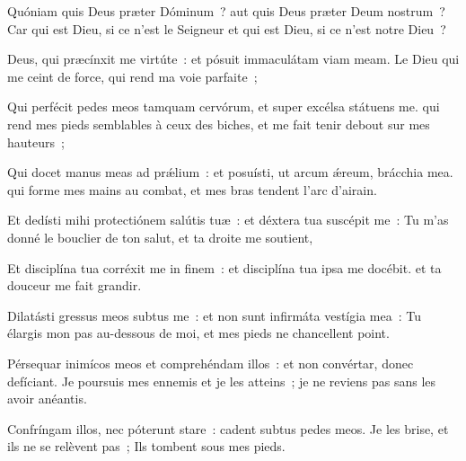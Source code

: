 
\begin{paracol}{2}

\LigneParacol{0cm}
{Quóniam quis Deus præter Dóminum~? \GreStar{} aut quis Deus præter Deum nostrum~?}
{Car qui est Dieu, si ce n'est le Seigneur et qui est Dieu, si ce n'est notre Dieu~? }

\LigneParacol{0.2cm}
{Deus, qui præcínxit me virtúte~: \GreStar{} et pósuit immaculátam viam meam.}
{Le Dieu qui me ceint de force, qui rend ma voie parfaite~; }

\LigneParacol{0.2cm}
{Qui perfécit pedes meos tamquam cervórum, \GreStar{} et super excélsa státuens me.}
{qui rend mes pieds semblables à ceux des biches, et me fait tenir debout sur mes hauteurs~; }

\LigneParacol{0.2cm}
{Qui docet manus meas ad prǽlium~: \GreStar{} et posuísti, ut arcum ǽreum, brácchia mea.}
{qui forme mes mains au combat, et mes bras tendent l'arc d'airain. }

\LigneParacol{0.2cm}
{Et dedísti mihi protectiónem salútis tuæ~: \GreStar{} et déxtera tua suscépit me~:}
{Tu m'as donné le bouclier de ton salut, et ta droite me soutient,}

\LigneParacol{0.2cm}
{Et disciplína tua corréxit me in finem~: \GreStar{} et disciplína tua ipsa me docébit.}
{et ta douceur me fait grandir. }

\LigneParacol{0.2cm}
{Dilatásti gressus meos subtus me~: \GreStar{} et non sunt infirmáta vestígia mea~:}
{Tu élargis mon pas au-dessous de moi, et mes pieds ne chancellent point. }

\LigneParacol{0.2cm}
{Pérsequar inimícos meos et comprehéndam illos~: \GreStar{} et non convértar, donec defíciant.}
{Je poursuis mes ennemis et je les atteins~; je ne reviens pas sans les avoir anéantis. }

\LigneParacol{0.2cm}
{Confríngam illos, nec póterunt stare~: \GreStar{} cadent subtus pedes meos.}
{Je les brise, et ils ne se relèvent pas~; Ils tombent sous mes pieds. }

\end{paracol}
\Gloria
